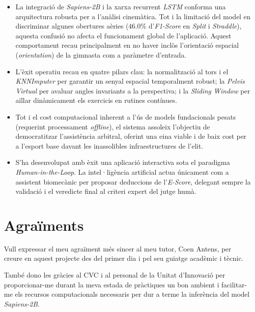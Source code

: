 \documentclass[10pt,a4paper,twocolumn,twoside]{article}
\begin{document}
\begin{itemize}
    \setlength{\itemsep}{0.5em} 
    
    \item La integració de \textit{Sapiens-2B} i la xarxa recurrent \textit{LSTM} conforma una arquitectura robusta per a l'anàlisi cinemàtica. Tot i la limitació del model en discriminar algunes obertures aèries (46.0\% d'\textit{F1-Score} en \textit{Split} i \textit{Straddle}), aquesta confusió no afecta el funcionament global de l'aplicació. Aquest comportament recau principalment en no haver inclòs l'orientació espacial (\textit{orientation}) de la gimnasta com a paràmetre d'entrada.

    \item L'èxit operatiu recau en quatre pilars clau: la normalització al tors i el \textit{KNNImputer} per garantir un senyal espacial temporalment robust; la \textit{Pelvis Virtual} per avaluar angles invariants a la perspectiva; i la \textit{Sliding Window} per aïllar dinàmicament els exercicis en rutines contínues.

    \item Tot i el cost computacional inherent a l'ús de models fundacionals pesats (requerint processament \textit{offline}), el sistema assoleix l'objectiu de democratitzar l'assistència arbitral, oferint una eina viable i de baix cost per a l'esport base davant les inassolibles infraestructures de l'elit.

    \item S'ha desenvolupat amb èxit una aplicació interactiva sota el paradigma \textit{Human-in-the-Loop}. La intel·ligència artificial actua únicament com a assistent biomecànic per proposar deduccions de l'\textit{E-Score}, delegant sempre la validació i el veredicte final al criteri expert del jutge humà.
\end{itemize}

\section*{Agraïments}
Vull expressar el meu agraïment més sincer al meu tutor, Coen Antens, per creure en aquest projecte des del primer dia i pel seu guiatge acadèmic i tècnic.

També dono les gràcies al CVC i al personal de la Unitat d'Innovació per proporcionar-me durant la meva estada de pràctiques un bon ambient i facilitar-me els recursos computacionals necessaris per dur a terme la inferència del model \textit{Sapiens-2B}.
\end{document}
